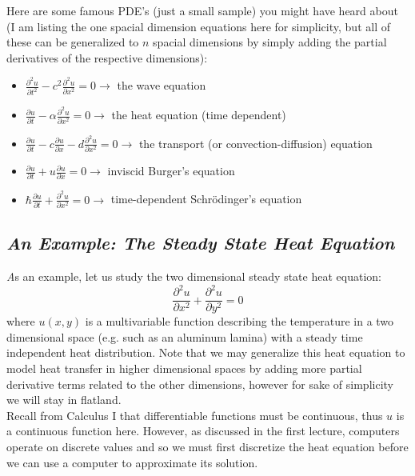\documentclass[11pt,a4paper,oneside]{report}
\begin{document}
Here are some famous PDE's (just a small sample) you might have heard about (I am listing the one spacial dimension equations here for simplicity, but all of these can be generalized to $n$ spacial dimensions by simply adding the partial derivatives of the respective dimensions):\\
\begin{itemize}
\item $\displaystyle\frac{\partial^2 u}{\partial t^2} - c^2\frac{\partial^2 u}{\partial x^2} = 0 \rightarrow$ the wave equation
\item $\displaystyle\frac{\partial u}{\partial t} - \alpha\frac{\partial^2 u}{\partial x^2} = 0 \rightarrow$ the heat equation (time dependent)
\item $\displaystyle\frac{\partial u}{\partial t} - c\frac{\partial u}{\partial x} - d\frac{\partial^2 u}{\partial x^2}= 0 \rightarrow$  the transport (or convection-diffusion) equation
\item $\displaystyle\frac{\partial u}{\partial t} + u\frac{\partial u}{\partial x} = 0 \rightarrow$ inviscid Burger's equation %
\item $\displaystyle\hbar\frac{\partial u}{\partial t} + \frac{\partial^2 u}{\partial x^2} = 0 \rightarrow$ time-dependent Schr\"{o}dinger's equation
\end{itemize}

{\center\color{magenta}
\subsection*{\it\huge An Example: The Steady State Heat Equation}}
{\it\huge A}s an example, let us study the two dimensional steady state heat equation:
\[\frac{\partial^2 u}{\partial x^2} + \frac{\partial^2 u}{\partial y^2}  = 0 \]
where $u(x, y)$ is a multivariable function describing the temperature in a two dimensional space (e.g. such as an aluminum lamina) with a steady time independent heat distribution. Note that we may generalize this heat equation to model heat transfer in higher dimensional spaces by adding more partial derivative terms related to the other dimensions, however for sake of simplicity we will stay in flatland.\\

Recall from Calculus I that differentiable functions must be continuous, thus $u$ is a continuous function here. However, as discussed in the first lecture, computers operate on discrete values and so we must first discretize the heat equation before we can use a computer to approximate its solution. \\ 
\end{document}

